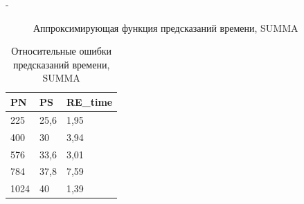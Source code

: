 \documentclass[unicode, t, 11pt]{beamer}%
\newlength{\mylen}
\begin{document}
\begin{frame}
\begin{columns}[T]
\begin{column}{\dimexpr\textwidth-\mylen}
\begin{figure}
							\caption{Аппроксимирующая функция предсказаний времени, SUMMA}
							\label{graph_SUMMA}
						\end{figure}
						\begin{table}
			 			\captionsetup{font=tiny, labelfont=tiny}
			 			\tiny
							\begin{tabularx}{\textwidth}{|X|X|X|}
							\hline
							PN   & PS   & RE\_time        \\ \hline
							225  & 25,6 & 1,95            \\ \hline
							400  & 30   & 3,94            \\ \hline
							576  & 33,6 & 3,01            \\ \hline
							784  & 37,8 & 7,59            \\ \hline
							1024 & 40   & 1,39            \\ \hline
							\end{tabularx}
						\caption{Относительные ошибки предсказаний времени, SUMMA}
					\end{table}
					\end{column}
		 		\end{columns}
			\end{frame}
\end{document}
